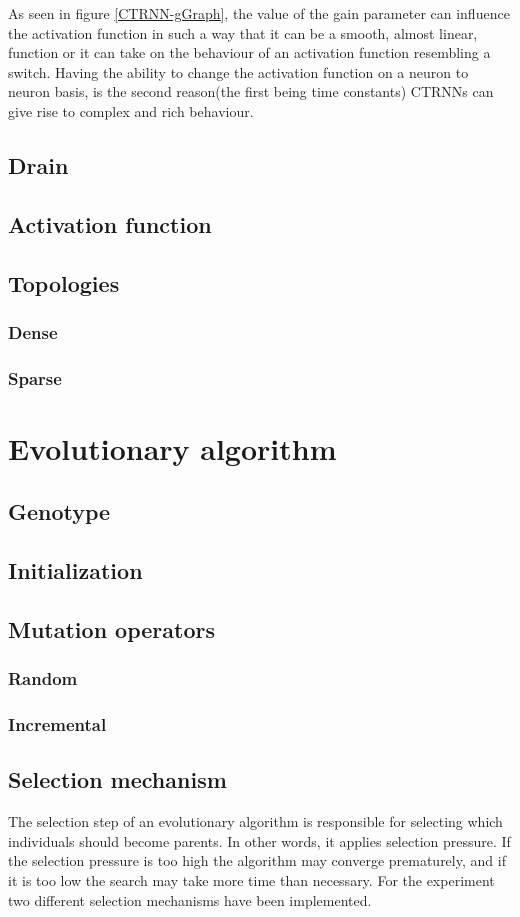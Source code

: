 As seen in figure \ref{CTRNN-gGraph}, the value of the gain parameter can influence the activation function in such a way that it can be a smooth, almost linear, function or it can take on the behaviour of an activation function resembling a switch.
Having the ability to change the activation function on a neuron to neuron basis, is the second reason(the first being time constants) CTRNNs can give rise to complex and rich behaviour.



	\subsection{Drain}
	\subsection{Activation function}
	\subsection{Topologies}
		\subsubsection{Dense}
		\subsubsection{Sparse}
\clearpage
\section{Evolutionary algorithm}
	\subsection{Genotype}
	\subsection{Initialization}
	\subsection{Mutation operators}
		\subsubsection{Random}
		\subsubsection{Incremental}
	\subsection{Selection mechanism}
	The selection step of an evolutionary algorithm is responsible for selecting which individuals should become parents.
	In other words, it applies selection pressure.
	If the selection pressure is too high the algorithm may converge prematurely, and if it is too low the search may take more time than necessary.
	For the experiment two different selection mechanisms have been implemented.
